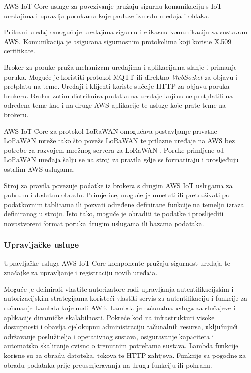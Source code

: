 AWS IoT Core usluge za povezivanje pružaju sigurnu komunikaciju s IoT uređajima i upravlja porukama koje prolaze između uređaja i oblaka.

Prilazni uređaj omogućuje uređajima sigurnu i efikasnu komunikaciju sa sustavom AWS. Komunikacija je osigurana sigurnosnim protokolima koji koriste  X.509 certifikate. 

Broker za poruke pruža mehanizam uređajima i aplikacijama slanje i primanje poruka. Moguće je koristiti protokol MQTT ili direktno \textit{WebSocket} za objavu i pretplatu na teme. Uređaji i klijenti koriste sučelje HTTP  za objavu poruka brokeru. Broker zatim distribuira podatke na uređaje koji su se pretplatili na određene teme kao i na druge AWS aplikacije te usluge koje prate teme na brokeru.

AWS IoT Core za protokol LoRaWAN omogućava postavljanje privatne LoRaWAN mreže tako što poveže LoRaWAN te prilazne uređaje na AWS bez potrebe za razvojem mrežnog servera za LoRaWAN . Poruke primljene od LoRaWAN uređaja šalju se na stroj za pravila  gdje se formatiraju i prosljeđuju ostalim AWS uslugama.

Stroj za pravila  povezuje podatke iz brokera s drugim AWS IoT uslugama za pohranu i dodatnu obradu. Primjerice, moguće je umetati ili pretraživati po podatkovnim tablicama ili pozvati određene definirane funkcije na temelju izraza definiranog u stroju. Isto tako, moguće je obraditi te podatke i proslijediti novostvoreni format poruka drugim uslugama ili bazama podataka.

\subsubsection{Upravljačke usluge}

Upravljačke usluge AWS IoT Core komponente pružaju sigurnost uređaja te značajke za upravljanje i registraciju novih uređaja.

Moguće je definirati vlastite autorizatore radi upravljanja autentifikacijskim i autorizacijskim strategijama koristeći vlastiti servis za autentifikaciju i funkcije za računanje Lambda koje nudi AWS. Lambda je računalna usluga za slučajeve i aplikacije dinamičke skalabilnosti. Pokreće kod na infrastrukturi visoke dostupnosti i obavlja cjelokupnu administraciju računalnih resursa, uključujući održavanje poslužitelja i operativnog sustava, osiguravanje kapaciteta i automatsko skaliranje ovisno o trenutnim potrebama sustava. Lambda funkcije korisne su za obradu datoteka, tokova te HTTP zahtjeva. Funkcije su pogodne za obradu podataka prije preusmjeravanja na drugu funkciju ili pohranu. 

